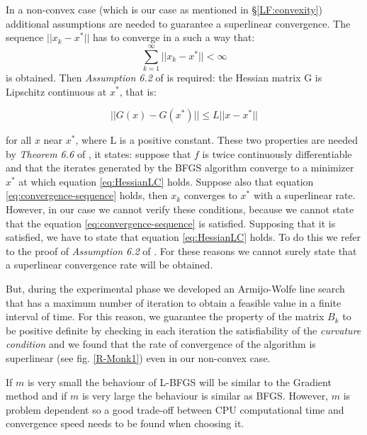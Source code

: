 In a non-convex case (which is our case as mentioned in \S \ref{LF:convexity}) additional assumptions are needed to guarantee a superlinear convergence. The sequence $|| x_{k} - x^* ||$ has to converge in a such a way that:
\begin{equation}
\label{eq:convergence-sequence}
\sum_{k=1}^{\infty}|| x_{k} - x^* ||<\infty
\end{equation}
is obtained. Then \textit{Assumption 6.2} of \cite{numerical} is required: the Hessian matrix G is Lipschitz continuous at $x^*$, that is: 

\begin{equation}
\label{eq:HessianLC}
|| G(x)-G(x^*)  || \le L || x - x^*||
\end{equation}

for all $x$ near $x^*$, where L is a positive constant. These two properties are needed by \textit{Theorem 6.6} of \cite{numerical}, it states:  suppose that $f$ is twice continuously differentiable and that the iterates generated by the BFGS algorithm converge to a minimizer $x^*$ at which equation \ref{eq:HessianLC} holds. Suppose also that  equation \ref{eq:convergence-sequence} holds, then $x_{k}$ converges to $x^*$ with a superlinear rate. However, in our case we cannot verify these conditions, because we cannot state that the equation \ref{eq:convergence-sequence} is satisfied. Supposing that it is satisfied, we have to state that equation \ref{eq:HessianLC} holds. To do this we refer to the proof of \textit{Assumption 6.2} of \cite{numerical}. For these reasons we cannot surely state that a superlinear convergence rate will be obtained. 

But, during the experimental phase we developed an Armijo-Wolfe line search that has a maximum number of iteration to obtain a feasible value in a finite interval of time. For this reason, we guarantee the property of the matrix $B_{k}$ to be positive definite by checking in each iteration the satisfiability of the \textit{curvature condition} and we found that the rate of convergence of the algorithm is superlinear (see fig. \ref{R-Monk1}) even in our non-convex case.

If $m$ is very small the behaviour of L-BFGS will be similar to the Gradient method and if $m$ is very large the behaviour is similar as BFGS. However, $m$ is problem dependent so a good trade-off between CPU computational time and convergence speed needs to be found when choosing it.

